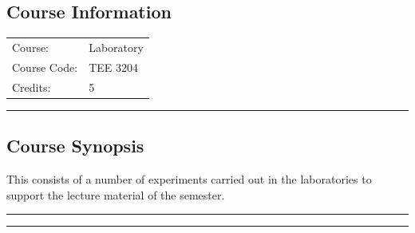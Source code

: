 
\subsection*{Course Information}
\vspace{0ex}%
\noindent\parbox{0.5\textwidth}{%
    \noindent\begin{tabular}{@{}ll}
                 \textsf{Course:}          & 	 Laboratory \\
                 \textsf{Course Code:}         & 	TEE 3204 \\
                 \textsf{Credits:}    & 	5
    \end{tabular}}
\vspace{2ex}\hrule\vspace{2ex}


\subsection*{Course Synopsis}
This consists of a number of experiments carried out in the laboratories to support the lecture material of the semester.
\vspace{2ex}\hrule
\vspace{2ex}\hrule\vspace{2ex}